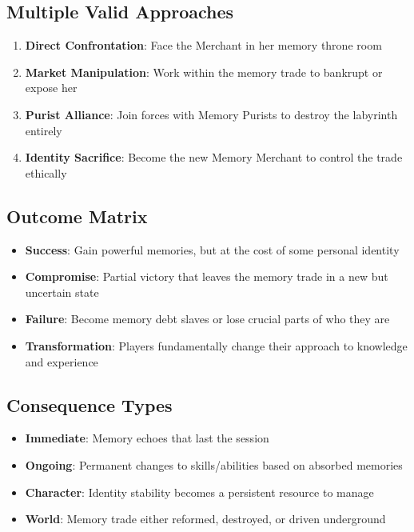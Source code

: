 \documentclass[11pt]{article}
\begin{document}
\subsection*{Multiple Valid Approaches}
\begin{enumerate}[leftmargin=*]
  \item \textbf{Direct Confrontation}: Face the Merchant in her memory throne room
  \item \textbf{Market Manipulation}: Work within the memory trade to bankrupt or expose her
  \item \textbf{Purist Alliance}: Join forces with Memory Purists to destroy the labyrinth entirely
  \item \textbf{Identity Sacrifice}: Become the new Memory Merchant to control the trade ethically
\end{enumerate}

\subsection*{Outcome Matrix}
\begin{itemize}[leftmargin=*]
  \item \textbf{Success}: Gain powerful memories, but at the cost of some personal identity
  \item \textbf{Compromise}: Partial victory that leaves the memory trade in a new but uncertain state
  \item \textbf{Failure}: Become memory debt slaves or lose crucial parts of who they are
  \item \textbf{Transformation}: Players fundamentally change their approach to knowledge and experience
\end{itemize}

\subsection*{Consequence Types}
\begin{itemize}[leftmargin=*]
  \item \textbf{Immediate}: Memory echoes that last the session
  \item \textbf{Ongoing}: Permanent changes to skills/abilities based on absorbed memories
  \item \textbf{Character}: Identity stability becomes a persistent resource to manage
  \item \textbf{World}: Memory trade either reformed, destroyed, or driven underground
\end{itemize}
\end{document}
